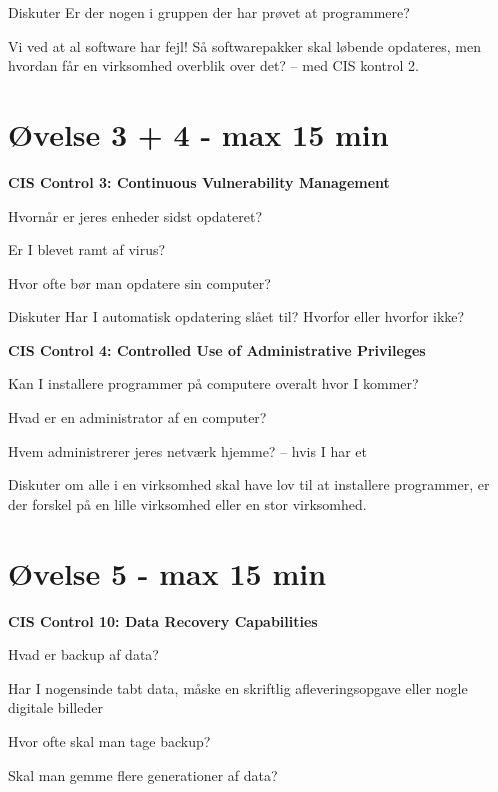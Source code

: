 \documentclass[a4paper,11pt,notitlepage,landscape]{report}
\begin{document}
Diskuter Er der nogen i gruppen der har prøvet at programmere?

Vi ved at al software har fejl! Så softwarepakker skal løbende opdateres, men hvordan får en virksomhed overblik over det? -- med CIS kontrol 2.

\eject

\section*{Øvelse 3 + 4 - max 15 min}

{\bf CIS Control 3: Continuous Vulnerability Management}
\begin{list1}
\item[\faSquareO] Hvornår er jeres enheder sidst opdateret?
\item[\faSquareO] Er I blevet ramt af virus?
\item[\faSquareO] Hvor ofte bør man opdatere sin computer?
\end{list1}

Diskuter Har I automatisk opdatering slået til? Hvorfor eller hvorfor ikke?


{\bf  CIS Control 4: Controlled Use of Administrative Privileges}

\begin{list1}
\item[\faSquareO] Kan I installere programmer på computere overalt hvor I kommer?
\item[\faSquareO] Hvad er en administrator af en computer?
\item[\faSquareO] Hvem administrerer jeres netværk hjemme? -- hvis I har et
\end{list1}

Diskuter om alle i en virksomhed skal have lov til at installere programmer, er der forskel på en lille virksomhed eller en stor virksomhed.

\eject

\section*{Øvelse 5 - max 15 min}


{\bf CIS Control 10: Data Recovery Capabilities}

\begin{list1}
\item[\faSquareO] Hvad er backup af data?
\item[\faSquareO] Har I nogensinde tabt data, måske en skriftlig afleveringsopgave eller nogle digitale billeder
\item[\faSquareO] Hvor ofte skal man tage backup?
\item[\faSquareO] Skal man gemme flere generationer af data?
\end{list1}
\end{document}
